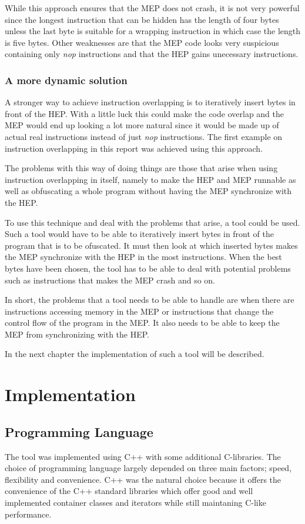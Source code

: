 \documentclass[11pt,twoside]{eitExjobb}
\begin{document}
While this approach ensures that the MEP does not crash, it is not very powerful since the longest instruction that can be hidden has the length of four bytes unless the last byte is suitable for a wrapping instruction in which case the length is five bytes. Other weaknesses are that the MEP code looks very suspicious containing only \emph{nop} instructions and that the HEP gains unecessary instructions.  

\subsection{A more dynamic solution}
A stronger way to achieve instruction overlapping is to iteratively insert bytes in front of the HEP. With a little luck this could make the code overlap and the MEP would end up looking a lot more natural since it would be made up of actual real instructions instead of just \emph{nop} instructions. The first example on instruction overlapping in this report was achieved using this approach. 

The problems with this way of doing things are those that arise when using instruction overlapping in itself, namely to make the HEP and MEP runnable as well as obfuscating a whole program  without having the MEP synchronize with the HEP.

To use this technique and deal with the problems that arise, a tool could be used. Such a tool would have to be able to iteratively insert bytes in front of the program that is to be ofuscated. It must then look at which inserted bytes makes the MEP synchronize with the HEP in the most instructions. When the best bytes have been chosen, the tool has to be able to deal with potential problems such as instructions that makes the MEP crash and so on. 

In short, the problems that a tool needs to be able to handle are when there are instructions accessing memory in the MEP or instructions that change the control flow of the program in the MEP. It also needs to be able to keep the MEP from synchronizing with the HEP.

In the next chapter the implementation of such a tool will be described.

\chapter{Implementation}
\section{Programming Language}
The tool was implemented using C++ with some additional C-libraries. The choice of programming language largely depended on three main factors; speed, flexibility and convenience. C++ was the natural choice because it offers the convenience of the C++ standard libraries which offer good and well implemented container classes and iterators while still maintaning C-like performance.
\end{document}
